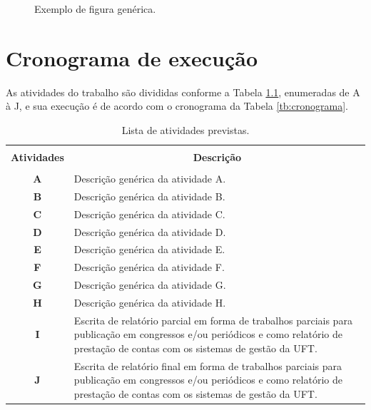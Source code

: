 \documentclass[12pt, consuni, professor]{uftpibic}
\theoremstyle{plain}
\begin{document}
\lipsum[10]

\begin{figure}[!htpb]
    \centering
    \caption{Exemplo de figura genérica.}
    \label{fig:exemplo2}
\end{figure}

\lipsum[11]

\vspace{1.5cm}
\chapter{Cronograma de execução}

As atividades do trabalho são divididas conforme a Tabela \ref{tb:atividades}, enumeradas de A à J, e sua execução é de acordo com o cronograma da Tabela \ref{tb:cronograma}.

\begin{table}[!h]
  \centering
  \caption{Lista de atividades previstas.}\label{tb:atividades}
  \begin{tabular}{cp{9.4cm}}
    \hline \hline &\\[-0.4cm]
    {\bf Atividades} & \multicolumn{1}{c}{\bf Descrição} \\
    \hline
    &\\[-0.4cm]
    \textbf{A} &  Descrição genérica da atividade A. \\[0.2cm]
    \textbf{B} &  Descrição genérica da atividade B.\\[0.2cm]
    \textbf{C} &  Descrição genérica da atividade C.\\[0.2cm]
    \textbf{D} &  Descrição genérica da atividade D. \\[0.2cm]
    \textbf{E} &  Descrição genérica da atividade E. \\[0.2cm]
    \textbf{F} &  Descrição genérica da atividade F.\\[0.2cm]
    \textbf{G} & Descrição genérica da atividade G.\\[0.2cm]
    \textbf{H} & Descrição genérica da atividade H. \\[0.2cm]
    \textbf{I} &  Escrita de relatório parcial em forma de trabalhos parciais para publicação em congressos e/ou periódicos e como relatório de prestação de contas com os sistemas de gestão da UFT. \\[0.2cm]
    \textbf{J} &  Escrita de relatório final em forma de trabalhos parciais para publicação em congressos e/ou periódicos e como relatório de prestação de contas com os sistemas de gestão da UFT. \\[0.2cm]
    \hline \hline
  \end{tabular}
\end{table}
\end{document}
